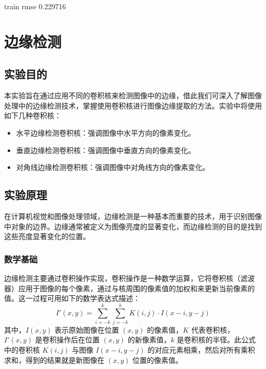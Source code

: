 \documentclass[a4paper,12pt]{article}
\begin{document}
train rmse 0.229716

\newpage
\section{边缘检测}
\subsection{实验目的}
本实验旨在通过应用不同的卷积核来检测图像中的边缘，借此我们可深入了解图像处理中的边缘检测技术，掌握使用卷积核进行图像边缘提取的方法。实验中将使用如下几种卷积核：

\begin{itemize}
	\item 水平边缘检测卷积核：强调图像中水平方向的像素变化。
	\item 垂直边缘检测卷积核：强调图像中垂直方向的像素变化。
	\item 对角线边缘检测卷积核：强调图像中对角线方向的像素变化。
\end{itemize}

\subsection{实验原理}
在计算机视觉和图像处理领域，边缘检测是一种基本而重要的技术，用于识别图像中对象的边界。边缘通常被定义为图像亮度的显著变化，而边缘检测的目的是找到这些亮度显著变化的位置。

\subsubsection{数学基础}
边缘检测主要通过卷积操作实现，卷积操作是一种数学运算，它将卷积核（滤波器）应用于图像的每个像素，通过与核周围的像素值的加权和来更新当前像素的值。这一过程可用如下的数学表达式描述：
\begin{equation}
	I'(x, y) = \sum_{i=-k}^{k} \sum_{j=-k}^{k} K(i, j) \cdot I(x-i, y-j)
\end{equation}
其中，$I(x, y)$ 表示原始图像在位置 $(x, y)$ 的像素值，$K$ 代表卷积核，$I'(x, y)$ 是卷积操作后在位置 $(x, y)$ 的新像素值，$k$ 是卷积核的半径。此公式中的卷积核 $K(i, j)$ 与图像 $I(x-i, y-j)$ 的对应元素相乘，然后对所有乘积求和，得到的结果就是新图像在 $(x, y)$ 位置的像素值。
\end{document}
